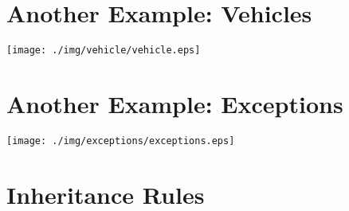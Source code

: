 \documentclass[a4paper, 9pt]{extarticle}
\begin{document}
\section{Another Example: Vehicles}

\begin{center}
  \texttt{[image: ./img/vehicle/vehicle.eps]}
\end{center}









\section{Another Example: Exceptions}

\begin{center}
  \texttt{[image: ./img/exceptions/exceptions.eps]}
\end{center}













\section{Inheritance Rules}
\end{document}
